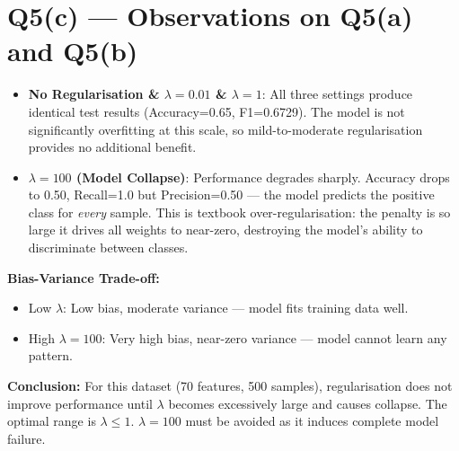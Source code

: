 \documentclass{article}
\begin{document}
\newpage
\section{Q5(c) --- Observations on Q5(a) and Q5(b)}

\begin{itemize}
    \item \textbf{No Regularisation \& $\lambda=0.01$ \& $\lambda=1$}: All three settings produce identical test results (Accuracy=0.65, F1=0.6729). The model is not significantly overfitting at this scale, so mild-to-moderate regularisation provides no additional benefit.

    \item \textbf{$\lambda=100$ (Model Collapse)}: Performance degrades sharply. Accuracy drops to 0.50, Recall=1.0 but Precision=0.50 --- the model predicts the positive class for \textit{every} sample. This is textbook over-regularisation: the penalty is so large it drives all weights to near-zero, destroying the model's ability to discriminate between classes.
\end{itemize}

\textbf{Bias-Variance Trade-off:}
\begin{itemize}
    \item Low $\lambda$: Low bias, moderate variance --- model fits training data well.
    \item High $\lambda=100$: Very high bias, near-zero variance --- model cannot learn any pattern.
\end{itemize}

\textbf{Conclusion:} For this dataset (70 features, 500 samples), regularisation does not improve performance until $\lambda$ becomes excessively large and causes collapse. The optimal range is $\lambda \leq 1$. $\lambda=100$ must be avoided as it induces complete model failure.
\end{document}
